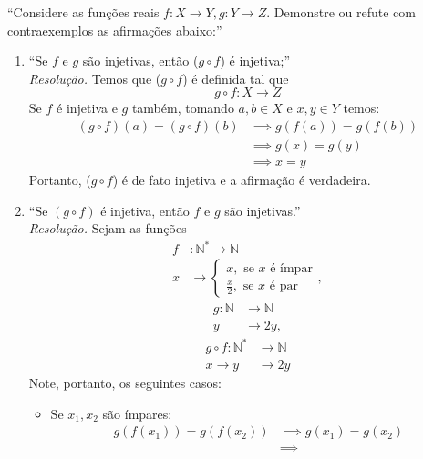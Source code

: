 \enquote{Considere as funções reais $f: X \rightarrow Y, g: Y \rightarrow Z$. Demonstre ou refute com contraexemplos as afirmações abaixo:}
    \begin{enumerate}
    \item \enquote{Se $f$ e $g$ são injetivas, então ($g \circ f$) é injetiva;} 
    \\ \emph{Resolução.} Temos que ($g \circ f$) é definida tal que
    \begin{displaymath}
        g \circ f: X \rightarrow Z 
    \end{displaymath}
    Se $f$ é injetiva e $g$ também, tomando $a, b \in X \text{ e } x, y \in Y$ temos:
    \begin{align*}
        (g \circ f)(a) = (g \circ f)(b) & \implies
        g(f(a)) = g(f(b)) \\ & \implies
        g(x) = g(y) \\ & \implies
        x = y
    \end{align*}
    Portanto, ($g \circ f$) é de fato injetiva e a afirmação é verdadeira.
    \item \enquote{Se $(g \circ f)$ é injetiva, então $f$ e $g$ são injetivas.} 
    \\ \emph{Resolução.} Sejam as funções
    \begin{align*}
        f&: \mathbb{N}^* \rightarrow \mathbb{N}\\
        x &\rightarrow \left\{\begin{array}{c}
            x, \text{ se $x$ é ímpar}\\
            \frac{x}{2}, \text{ se $x$ é par}
        \end{array}\right.,
    \end{align*}
    \begin{align*}
        g: \mathbb{N} &\rightarrow \mathbb{N} \\
        y &\rightarrow 2y,
    \end{align*}
    \begin{align*}
        g \circ f: \mathbb{N}^* &\rightarrow \mathbb{N} \\
        x \rightarrow y& \rightarrow 2y
    \end{align*}
    Note, portanto, os seguintes casos:
    \begin{itemize}
        \item Se $x_1, x_2$ são ímpares:
        \begin{align*}
            g(f(x_1)) = g(f(x_2)) & \implies
            g(x_1) = g(x_2) \\ & \implies

\end{align*}
\end{itemize}
\end{enumerate}

